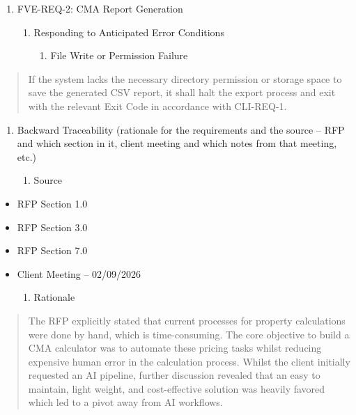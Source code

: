 \begin{enumerate}
\def\labelenumi{\Roman{enumi})}
\setcounter{enumi}{1}
\item
  FVE-REQ-2: CMA Report Generation

  \begin{enumerate}
  \def\labelenumii{\alph{enumii}.}
  \item
    Responding to Anticipated Error Conditions

    \begin{enumerate}
    \def\labelenumiii{\roman{enumiii}.}
    \item
      File Write or Permission Failure
    \end{enumerate}
  \end{enumerate}
\end{enumerate}

\begin{quote}
If the system lacks the necessary directory permission or storage space
to save the generated CSV report, it shall halt the export process and
exit with the relevant Exit Code in accordance with CLI-REQ-1.
\end{quote}

\begin{enumerate}
\def\labelenumi{\alph{enumi}.}
\setcounter{enumi}{1}
\item
  Backward Traceability (rationale for the requirements and the source
  -- RFP and which section in it, client meeting and which notes from
  that meeting, etc.)

  \begin{enumerate}
  \def\labelenumii{\roman{enumii}.}
  \item
    Source
  \end{enumerate}
\end{enumerate}

\begin{itemize}
\item
  RFP Section 1.0
\item
  RFP Section 3.0
\item
  RFP Section 7.0
\item
  Client Meeting -- 02/09/2026

  \begin{enumerate}
  \def\labelenumi{\roman{enumi}.}
  \item
    Rationale
  \end{enumerate}
\end{itemize}

\begin{quote}
The RFP explicitly stated that current processes for property
calculations were done by hand, which is time-consuming. The core
objective to build a CMA calculator was to automate these pricing tasks
whilst reducing expensive human error in the calculation process. Whilst
the client initially requested an AI pipeline, further discussion
revealed that an easy to maintain, light weight, and cost-effective
solution was heavily favored which led to a pivot away from AI
workflows.
\end{quote}

